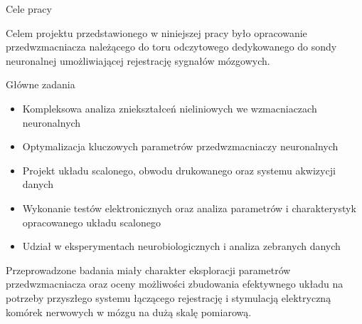 \begin{frame}{Cele pracy}

    \begin{alertblock}{}
        Celem projektu przedstawionego w niniejszej pracy było opracowanie przedwzmacniacza należącego do toru odczytowego dedykowanego do sondy neuronalnej umożliwiającej rejestrację sygnałów mózgowych.
    \end{alertblock}

    \begin{block}{Główne zadania}
        \begin{itemize}
            \item Kompleksowa analiza zniekształceń nieliniowych we wzmacniaczach neuronalnych
            \item Optymalizacja kluczowych parametrów przedwzmacniaczy neuronalnych
            \item  Projekt układu scalonego, obwodu drukowanego oraz systemu akwizycji danych
            \item Wykonanie testów elektronicznych oraz analiza parametrów i charakterystyk opracowanego układu scalonego
            \item Udział w eksperymentach neurobiologicznych i analiza zebranych danych
        \end{itemize}
    \end{block}
    \begin{alertblock}{}
        Przeprowadzone badania miały charakter eksploracji parametrów przedwzmacniacza oraz oceny możliwości zbudowania efektywnego układu na potrzeby przyszłego systemu łączącego rejestrację i stymulacją elektryczną komórek nerwowych w mózgu na dużą skalę pomiarową.
    \end{alertblock}
    
\end{frame}

